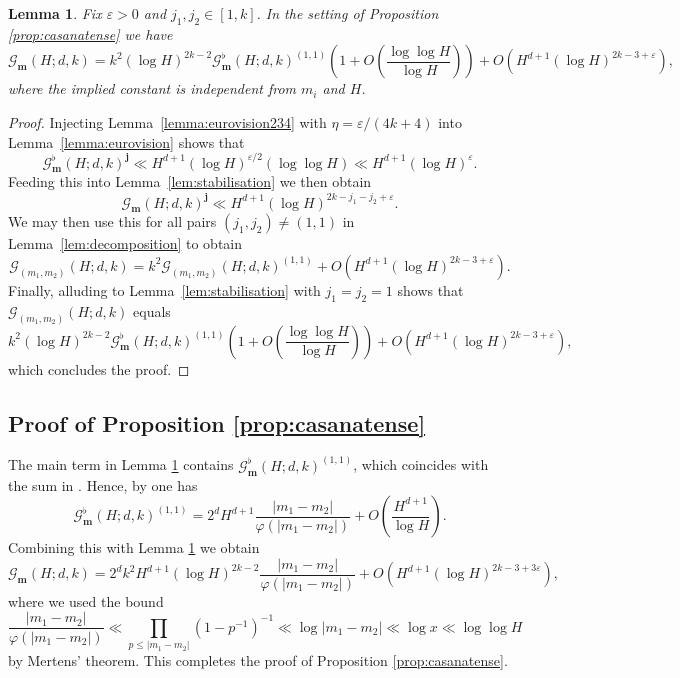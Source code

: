 \documentclass[reqno, 11pt]{amsart}
\numberwithin{equation}{section}
\newtheorem{lemma}[theorem]{Lemma}
\theoremstyle{definition}
\renewcommand{\phi}{\varphi}
\newcommand{\0}{\mathbf{0}}
\renewcommand{\leq}{\leqslant}
\renewcommand{\b}{\mathbf{b}}
\renewcommand{\b}{\mathbf}
\renewcommand{\epsilon}{\varepsilon}
\renewcommand{\leq}{\leqslant}
\renewcommand{\#}{\sharp}
\begin{document}
 \begin{lemma}\label{lemma:eurovisionUK000} Fix $\epsilon>0$ and $j_1,j_2 \in [1,k]$. In  the setting of 
 Proposition \ref{prop:casanatense}  we have  $$\mathcal G_{\mathbf m}(H;d,k) =k^2 (\log H)^{2k-2}
\mathcal G^\flat_{\mathbf m}(H;d,k)^{(1,1)} \left( 1 +O\left( \frac{\log \log H}{\log H}\right)\right)
+ O(   H^{d+1}  (\log H )^{2k- 3+\epsilon}) ,$$ where the implied constant is independent from  $m_i$ and $H$.
\end{lemma}  \begin{proof} Injecting Lemma~\ref{lemma:eurovision234}  with $\eta=\epsilon/(4k+4)$
into Lemma~\ref{lemma:eurovision} shows that  $$ \mathcal G^\flat_{\mathbf m}(H;d,k)^{\mathbf j} \ll
 H^{d+1}  (\log H )^{\epsilon/2} (\log \log H)\ll   H^{d+1}  (\log H )^\epsilon.$$ Feeding this into 
 Lemma~\ref{lem:stabilisation} we then obtain $$ \mathcal G_{\b m}(H;d,k)^{\mathbf j} \ll H^{d+1} 
(\log H )^{2k- j_1-j_2+\epsilon} .$$ We may then use this for all pairs $(j_1,j_2)\neq (1,1)$ in Lemma~\ref{lem:decomposition} 
to obtain $$\mathcal G_{(m_1,m_2)}(H;d,k)= k^2 \mathcal G_{(m_1,m_2)}(H;d,k)^{(1,1)}+ O\left(   H^{d+1} 
(\log H )^{2k- 3+\epsilon}  \right). $$ Finally,  alluding to Lemma~\ref{lem:stabilisation}
with $j_1=j_2=1$ shows that  $\mathcal G_{(m_1,m_2)}(H;d,k)$ equals  \[k^2 (\log H)^{2k-2}
\mathcal G^\flat_{\mathbf m}(H;d,k)^{(1,1)} \left( 1 +O\left( \frac{\log \log H}{\log H}\right)\right)
+ O(   H^{d+1}  (\log H )^{2k- 3+\epsilon}   ),\] which concludes the proof. \end{proof} 
\subsection{Proof of Proposition \ref{prop:casanatense}} \label{ss:Come non pensi} The main term in 
Lemma \ref{lemma:eurovisionUK000} contains  $\mathcal G^\flat_{\mathbf m}(H;d,k)^{(1,1)}$, which coincides with the 
 sum in  \cite[Definition 3.1]{MR4542704}. Hence, by \cite[Theorem 3.1]{MR4542704} one has  $$ \mathcal G^\flat_{\mathbf m}(H;d,k)^{(1,1)}= 2^d H^{d+1} \frac{|m_1-m_2|}{\phi(|m_1-m_2|)} +O\left( \frac{ H^{d+1}}{ \log H}\right).$$ Combining this 
with Lemma \ref{lemma:eurovisionUK000} we obtain  $$ \mathcal G_{\mathbf m}(H;d,k) =2^d   k^2  H^{d+1}  (\log H)^{2k-2}
\frac{|m_1-m_2|}{\phi(|m_1-m_2|)}  + O (   H^{d+1} (\log H )^{2k- 3+3\epsilon} ),$$  where we used the bound 
\[\frac{|m_1-m_2|}{\phi(|m_1-m_2|)}  \ll \prod_{p\leq |m_1-m_2|} (1-p^{-1})^{-1} \ll \log |m_1-m_2| \ll \log x \ll \log \log H   \] by Mertens' theorem. This completes   the proof of Proposition \ref{prop:casanatense}.
\end{document}
